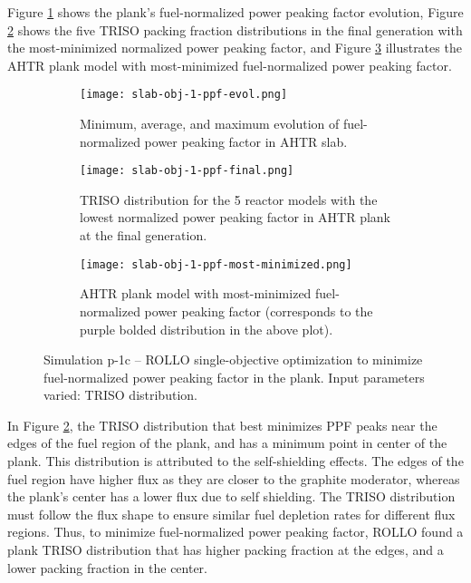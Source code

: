 Figure \ref{fig:slab-obj-1-ppf-evol} shows the plank's fuel-normalized power peaking 
factor evolution, Figure \ref{fig:slab-obj-1-ppf-final} shows the five \gls{TRISO} 
packing fraction distributions in the final generation with the most-minimized 
normalized power peaking factor, and Figure \ref{fig:slab-obj-1-ppf-most-minimized} 
illustrates the \gls{AHTR} plank model with most-minimized fuel-normalized power peaking 
factor. 
\begin{figure}[htbp!]
    \centering
    \begin{subfigure}{0.9\textwidth}
        \texttt{[image: slab-obj-1-ppf-evol.png]}
        \caption{Minimum, average, and maximum evolution of fuel-normalized power 
        peaking factor in AHTR slab.}
        \label{fig:slab-obj-1-ppf-evol} 
    \end{subfigure}
    \begin{subfigure}{0.9\textwidth}
        \texttt{[image: slab-obj-1-ppf-final.png]}
        \caption{TRISO distribution for the 5 reactor models with the 
        lowest normalized power peaking factor in AHTR plank at the final generation.}
        \label{fig:slab-obj-1-ppf-final} 
    \end{subfigure}
    \begin{subfigure}{0.9\textwidth}
        \texttt{[image: slab-obj-1-ppf-most-minimized.png]}
        \caption{\gls{AHTR} plank model with most-minimized fuel-normalized power 
        peaking factor
        (corresponds to the purple bolded distribution in the above plot).}
        \label{fig:slab-obj-1-ppf-most-minimized} 
    \end{subfigure}
    \caption{Simulation p-1c -- ROLLO single-objective optimization to minimize 
    fuel-normalized power peaking factor in the plank. 
    Input parameters varied: TRISO distribution.}
    \label{fig:slab-obj-1-ppf}
\end{figure}

In Figure \ref{fig:slab-obj-1-ppf-final}, the TRISO distribution that best minimizes 
PPF peaks near the edges of the fuel region of the plank, and has a minimum point in 
center of the plank.
This distribution is attributed to the self-shielding effects. 
The edges of the fuel region have higher flux as they are closer to the graphite 
moderator, whereas the plank's center has a lower flux due to self shielding. 
The TRISO distribution must follow the flux shape to ensure similar fuel depletion 
rates for different flux regions. 
Thus, to minimize fuel-normalized power peaking factor, \gls{ROLLO} found a plank 
\gls{TRISO} distribution that has higher packing fraction at the edges, and a 
lower packing fraction in the center. 

